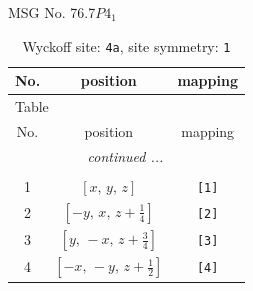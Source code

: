 \documentclass[fleqn,8pt]{jsarticle}
\begin{document}
\setcounter{MaxMatrixCols}{32}

\renewcommand{\tablename}{Table~}
\renewcommand{\figurename}{Figure~}
\begin{center}
\LARGE
MSG No. 76.7\quad$P4_{1}$
\end{center}
\renewcommand{\arraystretch}{1.2}
\begin{longtable}{ccc}
\caption{Wyckoff site: {\tt 4a}, site symmetry: {\tt 1}}
 \\
 \hline \hline
No. & position & mapping \\ \hline \endfirsthead

\multicolumn{2}{l}{\tablename\ \thetable{}} \\
 \hline \hline
No. & position & mapping \\ \hline \endhead

 \hline \hline
\multicolumn{2}{r}{\footnotesize\it continued ...} \\ \endfoot

 \hline \hline
\multicolumn{2}{r}{} \\ \endlastfoot

1 & $\left[ x,\, y,\, z \right]$ & {\tt [1]} \\ \hline
2 & $\left[ - y,\, x,\, z + \frac{1}{4} \right]$ & {\tt [2]} \\ \hline
3 & $\left[ y,\, - x,\, z + \frac{3}{4} \right]$ & {\tt [3]} \\ \hline
4 & $\left[ - x,\, - y,\, z + \frac{1}{2} \right]$ & {\tt [4]} \\
\end{longtable}
\end{document}
